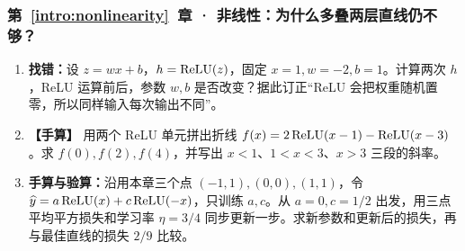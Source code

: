\subsubsection*{第~\ref*{intro:nonlinearity}~章 · 非线性：为什么多叠两层直线仍不够？}
\begin{enumerate}[label={},leftmargin=4.8em,itemsep=4pt]
\item[\textbf{C-012.}] \leavevmode{}\label{exercise:C-012}\label{exercise:relu-determinism}\textbf{找错：}设 $z=wx+b$，$h=\operatorname{ReLU}(z)$，固定 $x=1,w=-2,b=1$。计算两次 $h$，ReLU 运算前后，参数 $w,b$ 是否改变？据此订正“ReLU 会把权重随机置零，所以同样输入每次输出不同”。
\item[\textbf{C-013.}] \leavevmode{}\label{exercise:C-013}\label{exercise:relu-piecewise-slopes}\textbf{【手算】} 用两个 ReLU 单元拼出折线 $f(x)=2\operatorname{ReLU}(x-1)-\operatorname{ReLU}(x-3)$。求 $f(0),f(2),f(4)$，并写出 $x<1$、$1<x<3$、$x>3$ 三段的斜率。
\item[\textbf{C-014.}] \leavevmode{}\label{exercise:C-014}\label{exercise:relu-output-weight-update}\textbf{手算与验算：}沿用本章三个点 $(-1,1),(0,0),(1,1)$，令 $\widehat{y}=a\operatorname{ReLU}(x)+c\operatorname{ReLU}(-x)$，只训练 $a,c$。从 $a=0,c=1/2$ 出发，用三点平均平方损失和学习率 $\eta=3/4$ 同步更新一步。求新参数和更新后的损失，再与最佳直线的损失 $2/9$ 比较。
\end{enumerate}
